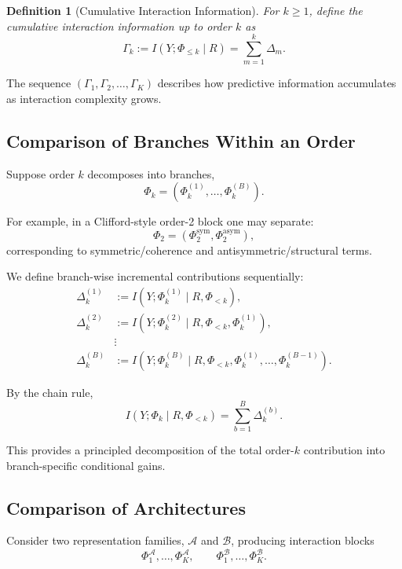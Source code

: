 \documentclass[11pt]{article}
\newtheorem{definition}{Definition}
\newcommand{\1}{\mathbf{1}}
\begin{document}
\begin{definition}[Cumulative Interaction Information]
For $k \ge 1$, define the cumulative interaction information up to order $k$ as
\begin{equation}
\Gamma_k
:=
I(Y;\Phi_{\le k}\mid R)
=
\sum_{m=1}^k \Delta_m.
\label{eq:cumulative_gamma}
\end{equation}
\end{definition}

The sequence $(\Gamma_1,\Gamma_2,\ldots,\Gamma_K)$ describes how predictive information accumulates
as interaction complexity grows.

\subsection{Comparison of Branches Within an Order}

Suppose order $k$ decomposes into branches,
\[
\Phi_k = (\Phi_k^{(1)},\ldots,\Phi_k^{(B)}).
\]

For example, in a Clifford-style order-2 block one may separate:
\[
\Phi_2 = (\Phi_2^{\mathrm{sym}}, \Phi_2^{\mathrm{asym}}),
\]
corresponding to symmetric/coherence and antisymmetric/structural terms.

We define branch-wise incremental contributions sequentially:
\begin{align}
\Delta_k^{(1)}
&:= I(Y;\Phi_k^{(1)} \mid R,\Phi_{<k}),
\\
\Delta_k^{(2)}
&:= I(Y;\Phi_k^{(2)} \mid R,\Phi_{<k},\Phi_k^{(1)}),
\\
&\vdots \nonumber \\
\Delta_k^{(B)}
&:= I(Y;\Phi_k^{(B)} \mid R,\Phi_{<k},\Phi_k^{(1)},\ldots,\Phi_k^{(B-1)}).
\label{eq:branchwise_cmi}
\end{align}

By the chain rule,
\begin{equation}
I(Y;\Phi_k \mid R,\Phi_{<k})
=
\sum_{b=1}^B \Delta_k^{(b)}.
\label{eq:branchwise_chain}
\end{equation}

This provides a principled decomposition of the total order-$k$ contribution into branch-specific
conditional gains.

\subsection{Comparison of Architectures}

Consider two representation families, $\mathcal{A}$ and $\mathcal{B}$, producing interaction blocks
\[
\Phi^{\mathcal{A}}_1,\ldots,\Phi^{\mathcal{A}}_K,
\qquad
\Phi^{\mathcal{B}}_1,\ldots,\Phi^{\mathcal{B}}_K.
\]
\end{document}
